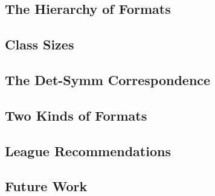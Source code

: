 \documentclass[12pt, leqno]{article}
\begin{document}

        \subsection {The Hierarchy of Formats} %
        \subsection {Class Sizes}
        \subsection {The Det-Symm Correspondence}  %
        \subsection {Two Kinds of Formats}




        \subsection {League Recommendations}
        \subsection {Future Work}
        




\end{document}
